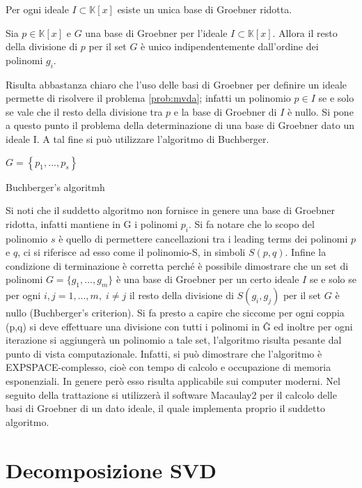 \begin{prop}
	Per ogni ideale $I \subset \mathbb{K}[x]$ esiste un unica base di Groebner ridotta.
\end{prop}

\begin{prop}
	Sia $p \in \mathbb{K}[x]$ e $G$ una base di Groebner per l'ideale $I \subset \mathbb{K}[x]$. Allora il resto della divisione di $p$ per il set $G$ è unico indipendentemente dall'ordine dei polinomi $g_i$.
\end{prop}
Risulta abbastanza chiaro che l'uso delle basi di Groebner per definire un ideale permette di risolvere il problema \ref{prob:mvda}; infatti un polinomio $p \in I$ se e solo se vale che il resto della divisione tra $p$ e la base di Groebner di $I$ è nullo.
Si pone a questo punto il problema della determinazione di una base di Groebner dato un ideale I. A tal fine si può utilizzare l'algoritmo di Buchberger.

\begin{algorithm}[H]
	\SetAlgoLined
	$G = \left\lbrace p_1, ..., p_s \right\rbrace $\;
	
	\caption{Buchberger's algoritmh}
\end{algorithm}

\medskip
Si noti che il suddetto algoritmo non fornisce in genere una base di Groebner ridotta, infatti mantiene in G i polinomi $p_i$. 
Si fa notare che lo scopo del polinomio $s$ è quello di permettere cancellazioni tra i leading terms dei polinomi $p$ e $q$, ci si riferisce ad esso come il polinomio-S, in simboli $S(p,q)$. Infine la condizione di terminazione è corretta perché è possibile dimostrare che un set di polinomi $G = \{g_1, ..., g_m\}$ è una base di Groebner per un certo ideale $I$ se e solo se per ogni $i,j = 1,..., m , \; i\neq j$ il resto della divisione di $S(g_i, g_j)$ per il set $G$ è nullo (Buchberger's criterion). Si fa presto a capire che siccome per ogni coppia (p,q) si deve effettuare una divisione con tutti i polinomi in \^{G} ed inoltre per ogni iterazione si aggiungerà un polinomio a tale set, l'algoritmo risulta pesante dal punto di vista computazionale. Infatti, si può dimostrare che l'algoritmo è EXPSPACE-complesso, cioè con tempo di calcolo e occupazione di memoria esponenziali. In genere però esso risulta applicabile sui computer moderni.
Nel seguito della trattazione si utilizzerà il software Macaulay2 per il calcolo delle basi di Groebner di un dato ideale, il quale implementa proprio il suddetto algoritmo.


\section{Decomposizione SVD}
\label{sec:SVD}


